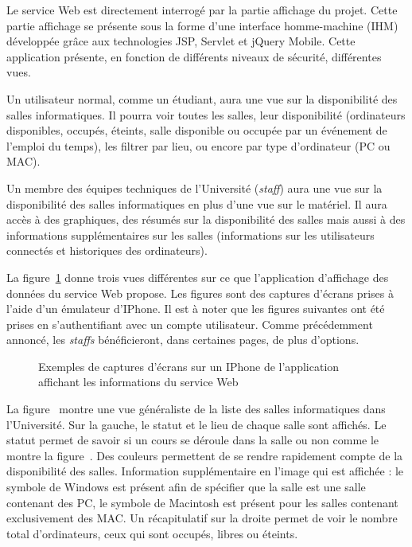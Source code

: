 Le service Web est directement interrog\'e par la partie affichage du projet.
Cette partie affichage se pr\'esente sous la forme d'une interface homme-machine (IHM) d\'evelopp\'ee gr\^ace aux technologies JSP, Servlet et jQuery Mobile.
Cette application pr\'esente, en fonction de diff\'erents niveaux de s\'ecurit\'e, diff\'erentes vues.

Un utilisateur normal, comme un \'etudiant, aura une vue sur la disponibilit\'e des salles informatiques.
Il pourra voir toutes les salles, leur disponibilit\'e (ordinateurs disponibles, occup\'es, \'eteints, salle disponible ou occup\'ee par un \'ev\'enement de l'emploi du temps), les filtrer par lieu, ou encore par type d'ordinateur (PC ou MAC).

Un membre des \'equipes techniques de l'Universit\'e (\textit{staff}) aura une vue sur la disponibilit\'e des salles informatiques en plus d'une vue sur le mat\'eriel.
Il aura acc\`es \`a des graphiques, des r\'esum\'es sur la disponibilit\'e des salles mais aussi \`a des informations suppl\'ementaires sur les salles (informations sur les utilisateurs connect\'es et historiques des ordinateurs).

La figure~\ref{figure:exempleIPhone} donne trois vues diff\'erentes sur ce que l'application d'affichage des donn\'ees du service Web propose.
Les figures sont des captures d'\'ecrans prises \`a l'aide d'un \'emulateur d'IPhone.
Il est \`a noter que les figures suivantes ont \'et\'e prises en s'authentifiant avec un compte utilisateur.
Comme pr\'ec\'edemment annonc\'e, les \textit{staffs} b\'en\'eficieront, dans certaines pages, de plus d'options.

\begin{figure}[!ht]
	\centering
	\qquad
	\qquad
	\caption{Exemples de captures d'\'ecrans sur un IPhone de l'application affichant les informations du service Web}
	\label{figure:exempleIPhone}

\end{figure}

La figure~ montre une vue g\'en\'eraliste de la liste des salles informatiques dans l'Universit\'e.
Sur la gauche, le statut et le lieu de chaque salle sont affich\'es. 
Le statut permet de savoir si un cours se d\'eroule dans la salle ou non comme le montre la figure~.
Des couleurs permettent de se rendre rapidement compte de la disponibilit\'e des salles.
Information suppl\'ementaire en l'image qui est affich\'ee : le symbole de Windows est pr\'esent afin de sp\'ecifier que la salle est une salle contenant des PC, le symbole de Macintosh est pr\'esent pour les salles contenant exclusivement des MAC.
Un r\'ecapitulatif sur la droite permet de voir le nombre total d'ordinateurs, ceux qui sont occup\'es, libres ou \'eteints.


